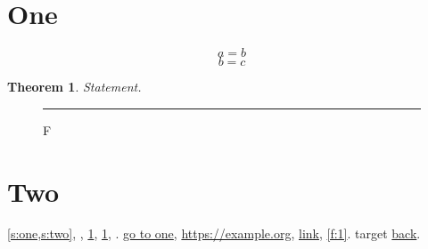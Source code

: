 \documentclass{article}
\newtheorem{thm}{Theorem}
\begin{document}
\section{One}\label{s:one}\begin{equation}a=b\label{e:a}\end{equation}\begin{equation}b=c\label{e:b}\end{equation}
\begin{thm}\label{t:x}Statement.\end{thm}
\begin{figure}\centering\rule{2cm}{1cm}\caption{F}\label{f:1}\end{figure}
\section{Two}\label{s:two}
\cref{s:one,s:two}, , \cref{t:x}, \cref{f:1}, .
\hyperref[s:one]{go to one}, \url{https://example.org}, \href{https://example.org}{link}, \autoref{f:1}.
\hypertarget{t1}{target} \hyperlink{t1}{back}.
\end{document}
